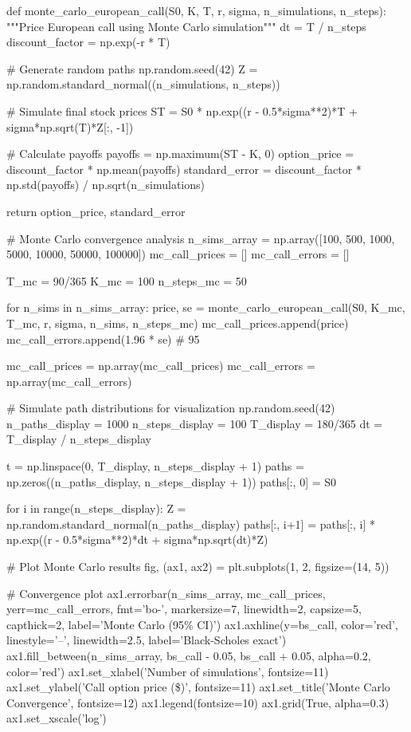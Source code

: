 \documentclass[a4paper, 11pt]{article}
\begin{document}
\begin{pycode}
def monte_carlo_european_call(S0, K, T, r, sigma, n_simulations, n_steps):
    """Price European call using Monte Carlo simulation"""
    dt = T / n_steps
    discount_factor = np.exp(-r * T)

    # Generate random paths
    np.random.seed(42)
    Z = np.random.standard_normal((n_simulations, n_steps))

    # Simulate final stock prices
    ST = S0 * np.exp((r - 0.5*sigma**2)*T + sigma*np.sqrt(T)*Z[:, -1])

    # Calculate payoffs
    payoffs = np.maximum(ST - K, 0)
    option_price = discount_factor * np.mean(payoffs)
    standard_error = discount_factor * np.std(payoffs) / np.sqrt(n_simulations)

    return option_price, standard_error

# Monte Carlo convergence analysis
n_sims_array = np.array([100, 500, 1000, 5000, 10000, 50000, 100000])
mc_call_prices = []
mc_call_errors = []

T_mc = 90/365
K_mc = 100
n_steps_mc = 50

for n_sims in n_sims_array:
    price, se = monte_carlo_european_call(S0, K_mc, T_mc, r, sigma, n_sims, n_steps_mc)
    mc_call_prices.append(price)
    mc_call_errors.append(1.96 * se)  # 95%

mc_call_prices = np.array(mc_call_prices)
mc_call_errors = np.array(mc_call_errors)

# Simulate path distributions for visualization
np.random.seed(42)
n_paths_display = 1000
n_steps_display = 100
T_display = 180/365
dt = T_display / n_steps_display

t = np.linspace(0, T_display, n_steps_display + 1)
paths = np.zeros((n_paths_display, n_steps_display + 1))
paths[:, 0] = S0

for i in range(n_steps_display):
    Z = np.random.standard_normal(n_paths_display)
    paths[:, i+1] = paths[:, i] * np.exp((r - 0.5*sigma**2)*dt + sigma*np.sqrt(dt)*Z)

# Plot Monte Carlo results
fig, (ax1, ax2) = plt.subplots(1, 2, figsize=(14, 5))

# Convergence plot
ax1.errorbar(n_sims_array, mc_call_prices, yerr=mc_call_errors, fmt='bo-',
             markersize=7, linewidth=2, capsize=5, capthick=2, label='Monte Carlo (95\% CI)')
ax1.axhline(y=bs_call, color='red', linestyle='--', linewidth=2.5, label='Black-Scholes exact')
ax1.fill_between(n_sims_array, bs_call - 0.05, bs_call + 0.05, alpha=0.2, color='red')
ax1.set_xlabel('Number of simulations', fontsize=11)
ax1.set_ylabel('Call option price (\$)', fontsize=11)
ax1.set_title('Monte Carlo Convergence', fontsize=12)
ax1.legend(fontsize=10)
ax1.grid(True, alpha=0.3)
ax1.set_xscale('log')


\end{pycode}
\end{document}
